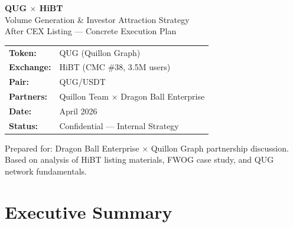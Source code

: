 \documentclass[11pt,a4paper]{article}
\begin{document}
\begin{titlepage}
  \pagecolor{hibtblack}
  \color{white}
  \vspace*{2cm}
  \begin{center}
    {\fontsize{36}{42}\selectfont\bfseries\color{hibtgreen} QUG $\times$ HiBT}\\[0.4cm]
    {\fontsize{18}{24}\selectfont\color{white}
      Volume Generation \& Investor Attraction Strategy}\\[0.3cm]
    {\large\color{midgray} After CEX Listing — Concrete Execution Plan}\\[2.5cm]

    \begin{tabular}{ll}
      \color{hibtgreen}\textbf{Token:}    & \color{white} QUG (Quillon Graph) \\[4pt]
      \color{hibtgreen}\textbf{Exchange:} & \color{white} HiBT (CMC \#38, 3.5M users) \\[4pt]
      \color{hibtgreen}\textbf{Pair:}     & \color{white} QUG/USDT \\[4pt]
      \color{hibtgreen}\textbf{Partners:} & \color{white} Quillon Team $\times$ Dragon Ball Enterprise \\[4pt]
      \color{hibtgreen}\textbf{Date:}     & \color{white} April 2026 \\[4pt]
      \color{hibtgreen}\textbf{Status:}   & \color{white} Confidential — Internal Strategy \\
    \end{tabular}

    \vfill
    {\small\color{midgray}
      Prepared for: Dragon Ball Enterprise $\times$ Quillon Graph partnership discussion.\\
      Based on analysis of HiBT listing materials, FWOG case study, and QUG network fundamentals.
    }
  \end{center}
\end{titlepage}
\pagecolor{white}
\color{black}

\newpage
\tableofcontents
\newpage

\section{Executive Summary}
\end{document}
